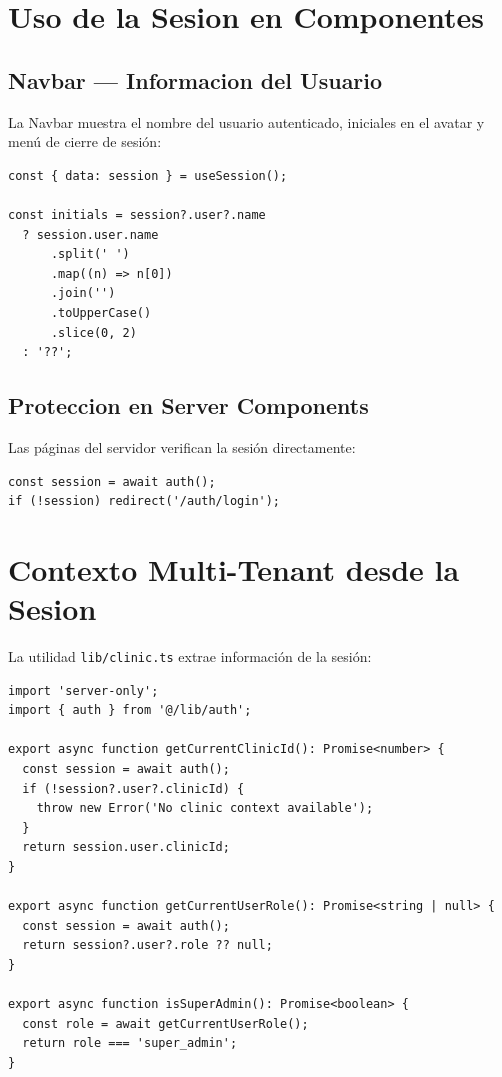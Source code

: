 \section{Uso de la Sesion en Componentes}

\subsection{Navbar --- Informacion del Usuario}

La Navbar muestra el nombre del usuario autenticado, iniciales en el avatar
y men\'u de cierre de sesi\'on:

\begin{lstlisting}[style=typescript, caption=Navbar - Uso de useSession]
const { data: session } = useSession();

const initials = session?.user?.name
  ? session.user.name
      .split(' ')
      .map((n) => n[0])
      .join('')
      .toUpperCase()
      .slice(0, 2)
  : '??';
\end{lstlisting}

\subsection{Proteccion en Server Components}

Las p\'aginas del servidor verifican la sesi\'on directamente:

\begin{lstlisting}[style=typescript, caption=Proteccion en server component]
const session = await auth();
if (!session) redirect('/auth/login');
\end{lstlisting}

\section{Contexto Multi-Tenant desde la Sesion}

La utilidad \texttt{lib/clinic.ts} extrae informaci\'on de la sesi\'on:

\begin{lstlisting}[style=typescript, caption=clinic.ts - Contexto multi-tenant]
import 'server-only';
import { auth } from '@/lib/auth';

export async function getCurrentClinicId(): Promise<number> {
  const session = await auth();
  if (!session?.user?.clinicId) {
    throw new Error('No clinic context available');
  }
  return session.user.clinicId;
}

export async function getCurrentUserRole(): Promise<string | null> {
  const session = await auth();
  return session?.user?.role ?? null;
}

export async function isSuperAdmin(): Promise<boolean> {
  const role = await getCurrentUserRole();
  return role === 'super_admin';
}
\end{lstlisting}

